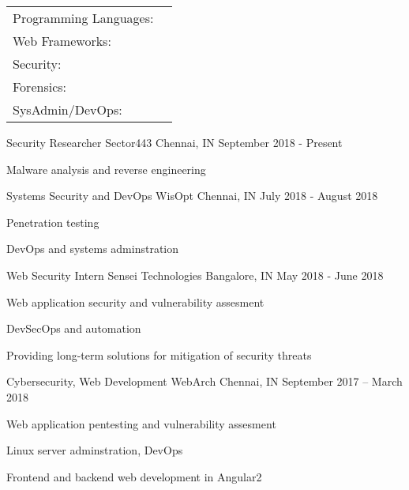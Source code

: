 \documentclass[]{awesome-cv}
\begin{document}
\begin{cventries}
	\cventry
	{}
	{\def\arraystretch{1.15}{\begin{tabular}{ l l }
		Programming Languages:  & {\skill{ Python, Shell, Nim, C, JS, PHP, HTML/CSS}} \\
		Web Frameworks:  & {\skill{ Flask, Angular2, Hugo, Bootstrap, Materialize/MDL}} \\
		Security: & {\skill{ Vulnerability Assessment, Web Security, Penetration Testing, Networking}} \\
		Forensics: & {\skill{ Filesystems, Data Recovery}} \\
		SysAdmin/DevOps:  & {\skill{ Unix tools/CLI, AWS, Digital Ocean, Git, TravisCI}} \\
		\end{tabular}}}
	{}
	{}
	{}
\end{cventries}


\vspace{-10mm}
\vspace{-3mm}
\begin{cventries}
	\cventry
	{Security Researcher}
	{Sector443}
	{Chennai, IN}
	{September 2018 - Present}
	{\begin{cvitems}
		\item {Malware analysis and reverse engineering}
	\end{cvitems}}
	\cventry
	{Systems Security and DevOps}
	{WisOpt}
	{Chennai, IN}
	{July 2018 - August 2018}
	{\begin{cvitems}
		\item {Penetration testing}
		\item {DevOps and systems adminstration}
	\end{cvitems}}
	\cventry
	{Web Security Intern}
	{Sensei Technologies}
	{Bangalore, IN}
	{May 2018 - June 2018}
	{\begin{cvitems}
		\item {Web application security and vulnerability assesment}
		\item {DevSecOps and automation}
		\item {Providing long-term solutions for mitigation of security threats}
	\end{cvitems}}
	\cventry
	{Cybersecurity, Web Development}
	{WebArch}
	{Chennai, IN}
	{September 2017 – March 2018}
	{\begin{cvitems}
		\item {Web application pentesting and vulnerability assesment}
		\item {Linux server adminstration, DevOps}
		\item {Frontend and backend web development in Angular2}
	\end{cvitems}}
\end{cventries}
\end{document}
